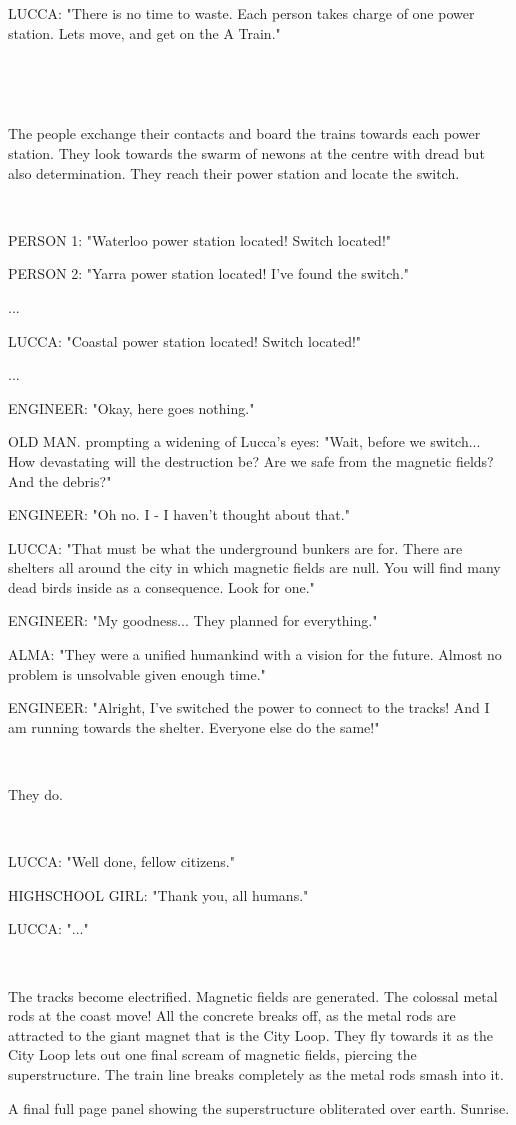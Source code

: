 \documentclass[11pt]{article}
\begin{document}
LUCCA: "There is no time to waste. 
Each person takes charge of one power station.
Lets move, and get on the A Train."

\ 

\ 

The people exchange their contacts and board the trains towards each power station.
They look towards the swarm of newons at the centre with dread but also determination.
They reach their power station and locate the switch. 

\ 

PERSON 1: "Waterloo power station located! Switch located!"

PERSON 2: "Yarra power station located! I've found the switch." 

...

LUCCA: "Coastal power station located! Switch located!"

...

ENGINEER: "Okay, here goes nothing."

OLD MAN. prompting a widening of Lucca's eyes: "Wait, before we switch...
How devastating will the destruction be? 
Are we safe from the magnetic fields?
And the debris?"

ENGINEER: "Oh no. 
I - I haven't thought about that."

LUCCA: "That must be what the underground bunkers are for.
There are shelters all around the city in which magnetic fields are null.
You will find many dead birds inside as a consequence. 
Look for one."

ENGINEER: "My goodness... They planned for everything."

ALMA: "They were a unified humankind with a vision for the future.
Almost no problem is unsolvable given enough time."

ENGINEER: "Alright, I've switched the power to connect to the tracks!
And I am running towards the shelter. 
Everyone else do the same!"

\ 

They do.

\ 

LUCCA: "Well done, fellow citizens."

HIGHSCHOOL GIRL: "Thank you, all humans."

LUCCA: "..."

\ 

The tracks become electrified. 
Magnetic fields are generated. 
The colossal metal rods at the coast move!
All the concrete breaks off, as the metal rods are attracted to the giant magnet that is the City Loop. 
They fly towards it as the City Loop lets out one final scream of magnetic fields, piercing the superstructure.
The train line breaks completely as the metal rods smash into it. 

A final full page panel showing the superstructure obliterated over earth.
Sunrise.
\end{document}
